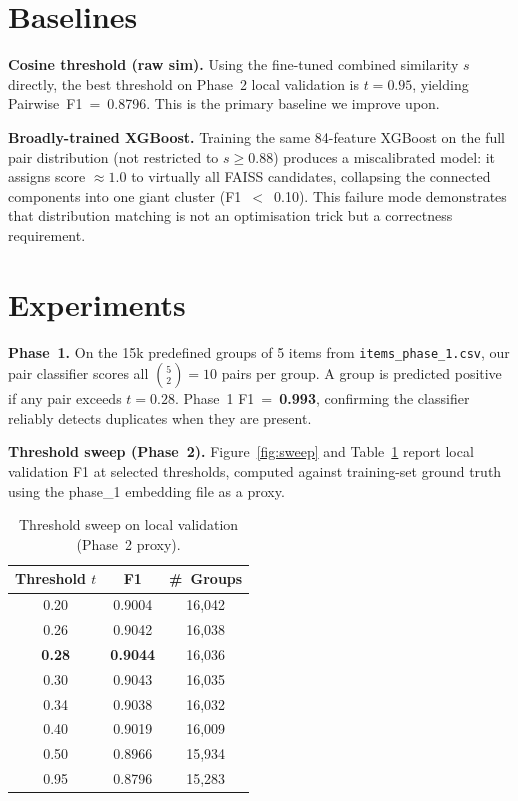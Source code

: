 \documentclass[10pt,twocolumn]{article}
\begin{document}
\section{Baselines}

\textbf{Cosine threshold (raw sim).}
Using the fine-tuned combined similarity $s$ directly, the best threshold
on Phase~2 local validation is $t = 0.95$, yielding Pairwise~F1~=~0.8796.
This is the primary baseline we improve upon.

\textbf{Broadly-trained XGBoost.}
Training the same 84-feature XGBoost on the full pair distribution (not
restricted to $s \geq 0.88$) produces a miscalibrated model: it assigns
score $\approx 1.0$ to virtually all FAISS candidates, collapsing the
connected components into one giant cluster (F1~$<$~0.10). This failure
mode demonstrates that distribution matching is not an optimisation
trick but a correctness requirement.

\section{Experiments}

\textbf{Phase~1.}
On the 15k predefined groups of 5 items from \texttt{items\_phase\_1.csv},
our pair classifier scores all $\binom{5}{2} = 10$ pairs per group.
A group is predicted positive if any pair exceeds $t = 0.28$.
Phase~1 F1~=~\textbf{0.993}, confirming the classifier reliably detects
duplicates when they are present.

\textbf{Threshold sweep (Phase~2).}
Figure~\ref{fig:sweep} and Table~\ref{tab:sweep} report local validation F1
at selected thresholds, computed against training-set ground truth using the
phase\_1 embedding file as a proxy.

\begin{table}[h]
\centering
\caption{Threshold sweep on local validation (Phase~2 proxy).}
\label{tab:sweep}
\begin{tabular}{ccc}
\toprule
Threshold $t$ & F1 & \#~Groups \\
\midrule
0.20 & 0.9004 & 16{,}042 \\
0.26 & 0.9042 & 16{,}038 \\
\textbf{0.28} & \textbf{0.9044} & 16{,}036 \\
0.30 & 0.9043 & 16{,}035 \\
0.34 & 0.9038 & 16{,}032 \\
0.40 & 0.9019 & 16{,}009 \\
0.50 & 0.8966 & 15{,}934 \\
0.95 & 0.8796 & 15{,}283 \\
\bottomrule
\end{tabular}
\end{table}
\end{document}
